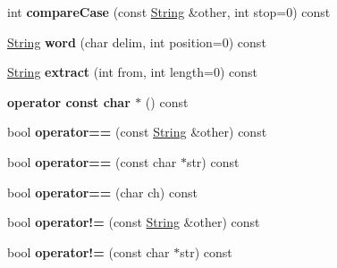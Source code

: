 \begin{DoxyCompactItemize}
\item 
int {\bfseries compare\+Case} (const \hyperlink{class_magnum_1_1_string}{String} \&other, int stop=0) const \hypertarget{class_magnum_1_1_string_ae18c6713484406646b276db8210af175}{}\label{class_magnum_1_1_string_ae18c6713484406646b276db8210af175}

\item 
\hyperlink{class_magnum_1_1_string}{String} {\bfseries word} (char delim, int position=0) const \hypertarget{class_magnum_1_1_string_ab67587968bb2f254426b4a6891d51f58}{}\label{class_magnum_1_1_string_ab67587968bb2f254426b4a6891d51f58}

\item 
\hyperlink{class_magnum_1_1_string}{String} {\bfseries extract} (int from, int length=0) const \hypertarget{class_magnum_1_1_string_a803b8fbb45479ff426534714f162dc65}{}\label{class_magnum_1_1_string_a803b8fbb45479ff426534714f162dc65}

\item 
{\bfseries operator const char $\ast$} () const \hypertarget{class_magnum_1_1_string_a052462069a3e139a69b88116bc8b9460}{}\label{class_magnum_1_1_string_a052462069a3e139a69b88116bc8b9460}

\item 
bool {\bfseries operator==} (const \hyperlink{class_magnum_1_1_string}{String} \&other) const \hypertarget{class_magnum_1_1_string_abc87daa85235a1fa0334d5aad76af032}{}\label{class_magnum_1_1_string_abc87daa85235a1fa0334d5aad76af032}

\item 
bool {\bfseries operator==} (const char $\ast$str) const \hypertarget{class_magnum_1_1_string_a34c0178e265b8eeff20a750c3a1d8190}{}\label{class_magnum_1_1_string_a34c0178e265b8eeff20a750c3a1d8190}

\item 
bool {\bfseries operator==} (char ch) const \hypertarget{class_magnum_1_1_string_a67f96b903219a03aa5d6715720cfbf02}{}\label{class_magnum_1_1_string_a67f96b903219a03aa5d6715720cfbf02}

\item 
bool {\bfseries operator!=} (const \hyperlink{class_magnum_1_1_string}{String} \&other) const \hypertarget{class_magnum_1_1_string_a3f789d339d7e6be1edaeb1e3b7e9e420}{}\label{class_magnum_1_1_string_a3f789d339d7e6be1edaeb1e3b7e9e420}

\item 
bool {\bfseries operator!=} (const char $\ast$str) const \hypertarget{class_magnum_1_1_string_aea4ab7ca79d652e0509a3b033260036e}{}\label{class_magnum_1_1_string_aea4ab7ca79d652e0509a3b033260036e}


\end{DoxyCompactItemize}
